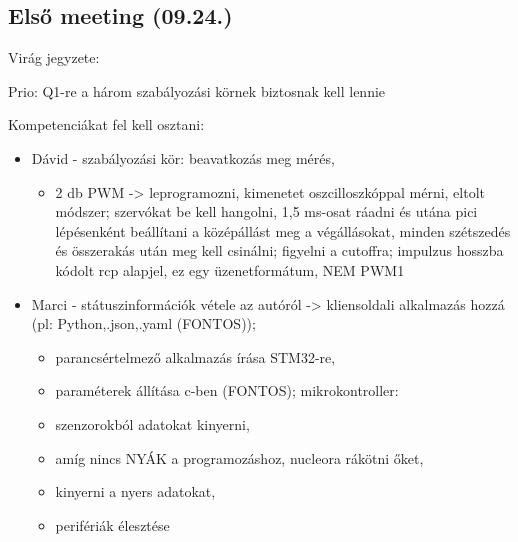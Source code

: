 \documentclass{article}
\begin{document}
\subsection{Első meeting (09.24.)}

Virág jegyzete:

Prio: Q1-re a három szabályozási körnek biztosnak kell lennie

\vspace{5mm} %

Kompetenciákat fel kell osztani:
\begin{itemize}
\item Dávid - szabályozási kör: beavatkozás meg mérés, 
\begin{itemize}
    \item 2 db PWM -> leprogramozni, kimenetet oszcilloszkóppal mérni, eltolt módszer; szervókat be kell hangolni, 1,5 ms-osat ráadni és utána pici lépésenként beállítani a középállást meg a végállásokat, minden szétszedés és összerakás után meg kell csinálni; figyelni a cutoffra; impulzus hosszba kódolt rcp alapjel, ez egy üzenetformátum, NEM PWM1
\end{itemize}
\item Marci - státuszinformációk vétele az autóról -> kliensoldali alkalmazás hozzá (pl: Python,.json,.yaml (FONTOS)); 
\begin{itemize}
    \item parancsértelmező alkalmazás írása STM32-re, 
    \item paraméterek állítása c-ben (FONTOS); mikrokontroller: \item szenzorokból adatokat kinyerni, 
    \item amíg nincs NYÁK a programozáshoz, nucleora rákötni őket, 
    \item kinyerni a  nyers adatokat, 
    \item perifériák élesztése
\end{itemize}


\end{itemize}
\end{document}
